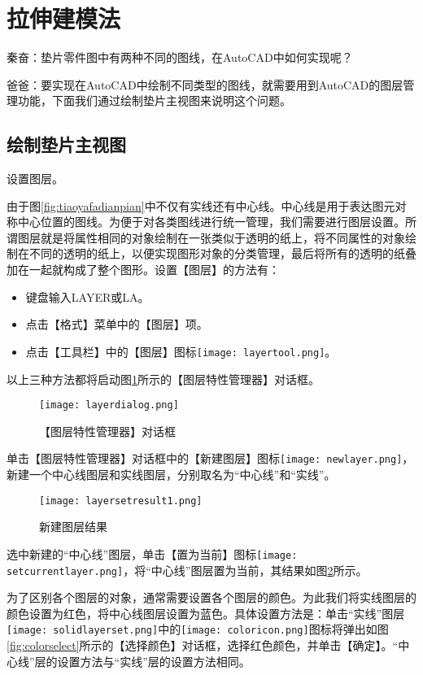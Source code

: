 \section{拉伸建模法}
秦奋：垫片零件图中有两种不同的图线，在AutoCAD中如何实现呢？

爸爸：要实现在AutoCAD中绘制不同类型的图线，就需要用到AutoCAD的图层管理功能，下面我们通过绘制垫片主视图来说明这个问题。
\subsection{绘制垫片主视图}\label{sec:dianpian}
\begin{procedure}
\item 设置图层。

由于图\ref{fig:tiaoyafadianpian}中不仅有实线还有中心线。中心线是用于表达图元对称中心位置的图线。为便于对各类图线进行统一管理，我们需要进行图层设置。所谓图层就是将属性相同的对象绘制在一张类似于透明的纸上，将不同属性的对象绘制在不同的透明的纸上，以便实现图形对象的分类管理，最后将所有的透明的纸叠加在一起就构成了整个图形。设置【图层】的方法有：
\begin{itemize}
\item 键盘输入LAYER或LA。
\item 点击【格式】菜单中的【图层】项。
\item 点击【工具栏】中的【图层】图标\texttt{[image: layertool.png]}。
\end{itemize}
以上三种方法都将启动图\ref{fig:layerdialog}所示的【图层特性管理器】对话框。
\begin{figure}[htbp]
\centering
\texttt{[image: layerdialog.png]}
\caption{【图层特性管理器】对话框}\label{fig:layerdialog}
\end{figure}

单击【图层特性管理器】对话框中的【新建图层】图标\texttt{[image: newlayer.png]}，新建一个中心线图层和实线图层，分别取名为“中心线”和“实线”。

\begin{figure}[htbp]
\centering
\texttt{[image: layersetresult1.png]}
\caption{新建图层结果}\label{fig:layersetresult1}
\end{figure}

选中新建的“中心线”图层，单击【置为当前】图标\texttt{[image: setcurrentlayer.png]}，将“中心线”图层置为当前，其结果如图\ref{fig:layersetresult1}所示。

为了区别各个图层的对象，通常需要设置各个图层的颜色。为此我们将实线图层的颜色设置为红色，将中心线图层设置为蓝色。具体设置方法是：单击“实线”图层\texttt{[image: solidlayerset.png]}中的\texttt{[image: coloricon.png]}图标将弹出如图\ref{fig:colorselect}所示的【选择颜色】对话框，选择红色颜色，并单击【确定】。“中心线”层的设置方法与“实线”层的设置方法相同。


\end{procedure}
